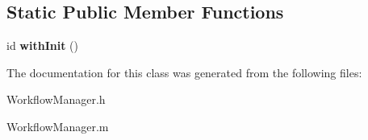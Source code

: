 \subsection*{\-Static \-Public \-Member \-Functions}
\begin{DoxyCompactItemize}
\item 
\hypertarget{interface_workflow_manager_a7af94e5ecb6735c84e30b68d256b4559}{
id {\bfseries with\-Init} ()}
\label{interface_workflow_manager_a7af94e5ecb6735c84e30b68d256b4559}

\end{DoxyCompactItemize}


\-The documentation for this class was generated from the following files\-:\begin{DoxyCompactItemize}
\item 
\-Workflow\-Manager.\-h\item 
\-Workflow\-Manager.\-m\end{DoxyCompactItemize}
